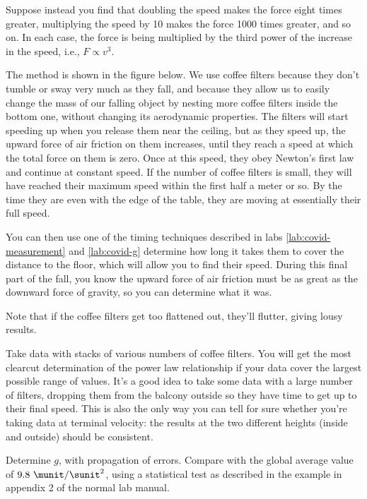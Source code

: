 Suppose instead you find that doubling the speed makes the
force eight times greater, multiplying the speed by 10 makes
the force 1000 times greater, and so on. In each case, the
force is being multiplied by the third power of the increase
in the speed, i.e., $F\propto v^3$.

\observations

The method is shown in the figure below. We use coffee
filters because they don't tumble or sway very much as they
fall, and because they allow us to easily change the mass of
our falling object by nesting more coffee filters inside the
bottom one, without changing its aerodynamic properties.
The filters will start speeding up when you release them
near the ceiling, but as they speed up, the upward force of
air friction on them increases, until they reach a speed at
which the total force on them is zero. Once at this speed,
they obey Newton's first law and continue at constant speed.
If the number of coffee filters is small,
they will have reached their maximum speed within the first
half a meter or so. By the time they are even with the edge
of the table, they are moving at essentially their full
speed.

You can then use one of the timing techniques described in labs \ref{lab:covid-measurement} and
\ref{lab:covid-g} determine how long
it takes them to cover the distance to the floor, which will
allow you to find their speed. During this final part of the
fall, you know the upward force of air friction must be as
great as the downward force of gravity, so you can
determine what it was.


Note that if the coffee filters get too flattened out,
they'll flutter, giving lousy results.

Take data with stacks of various numbers of coffee filters.
You will get the most clearcut determination of the power
law relationship if your data cover the largest possible
range of values. It's a good idea to take some data with a
large number of filters, dropping them from the balcony
outside so they have time to get up to their final speed.
This is also the only way you can tell for sure whether you're
taking data at terminal velocity: the results at the two different
heights (inside and outside) should be consistent.


\analysis

Determine $g$, with propagation of errors. Compare with the global average value of $9.8\ \munit/\sunit^2$,
using a statistical test as described in the example in appendix 2 of the normal lab manual.

